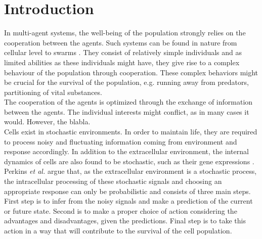 \chapter{Introduction}
In multi-agent systems, the well-being of the population strongly relies on the cooperation between the agents. Such systems can be found in nature from cellular level to swarms \cite{Perkins2009a, Tan2013}. They consist of relatively simple individuals and as limited abilities as these individuals might have, they give rise to a complex behaviour of the population through cooperation. These complex behaviors might be crucial for the survival of the population, e.g. running away from predators, partitioning of vital substances. \\
The cooperation of the agents is optimized through the exchange of information between the agents. The individual interests might conflict, as in many cases it would. However, the blabla. \\
Cells exist in stochastic environments. In order to maintain life, they are required to process noisy and fluctuating information coming from environment and response accordingly. In addition to the extracellular environment, the internal dynamics of cells are also found to be stochastic, such as their gene expressions \cite{Shahrezaei2008}. \\
Perkins \textit{et al.} \cite{Perkins2009a} argue that, as the extracellular environment is a stochastic process, the intracellular processing of these stochastic signals and choosing an appropriate response can only be probabilistic and consists of three main steps. First step is to infer from the noisy signals and make a prediction of the current or future state. Second is to make a proper choice of action considering the advantages and disadvantages, given the predictions. Final step is to take this action in a way that will contribute to the survival of the cell population. \\
